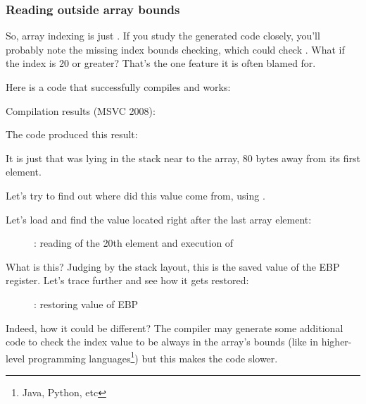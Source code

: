 \subsubsection{Reading outside array bounds}

So, array indexing is just .
If you study the generated code closely, you'll probably note the missing index bounds checking,
which could check .
What if the index is 20 or greater?
That's the one \CCpp feature it is often blamed for.

Here is a code that successfully compiles and works:



Compilation results (MSVC 2008):



The code produced this result:



It is just  that was lying in the stack near to the array, 80 bytes away from its first element.

\clearpage
\myindex{\olly}
Let's try to find out where did this value come from, using \olly.

Let's load and find the value located right after the last array element:

\begin{figure}[H]
\centering
{}
\caption{\olly: reading of the 20th element and execution of \printf}
\label{fig:array_BO_olly_r1}
\end{figure}

What is this? 
Judging by the stack layout,
this is the saved value of the EBP register.
\clearpage
Let's trace further and see how it gets restored:

\begin{figure}[H]
\centering
{}
\caption{\olly: restoring value of EBP}
\label{fig:array_BO_olly_r2}
\end{figure}

Indeed, how it could be different?
The compiler may generate some additional code to check the index value to be always
in the array's bounds (like in higher-level programming languages\footnote{Java, Python, etc})
but this makes the code slower.

